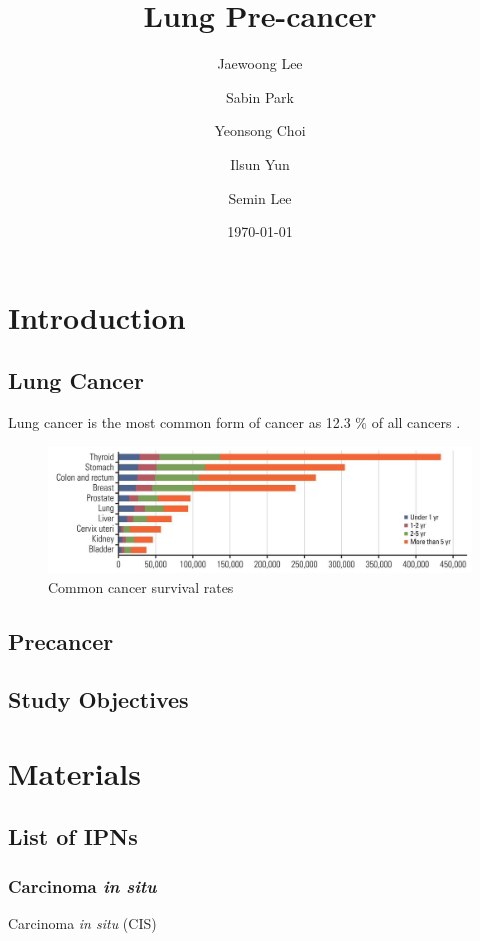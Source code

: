 \documentclass[a4paper]{article}
\title{Lung Pre-cancer}
\author{
    Jaewoong Lee
    \and
    Sabin Park
    \and
    Yeonsong Choi
    \and
    Ilsun Yun
    \and
    Semin Lee
}
\date{\today}
\begin{document}
    \maketitle
    \newpage

    \tableofcontents
    \listoftables
    \listoffigures
    \newpage

    \section{Introduction}
        \subsection{Lung Cancer}
            Lung cancer is the most common form of cancer as 12.3 \% of all cancers \cite{lung3}.

            \begin{figure}[ht]
                \centering
                \includegraphics[width=0.8 \linewidth]{figures/LungCancer/rate.png}
                \caption{Common cancer survival rates \protect\cite{lung6}}
                \label{fig:cancer-survival}
            \end{figure}

        \subsection{Precancer}

        \subsection{Study Objectives}

    \section{Materials}
        \subsection{List of IPNs}
            \subsubsection{Carcinoma \textit{in situ}}
                Carcinoma \textit{in situ} (CIS)
\end{document}
